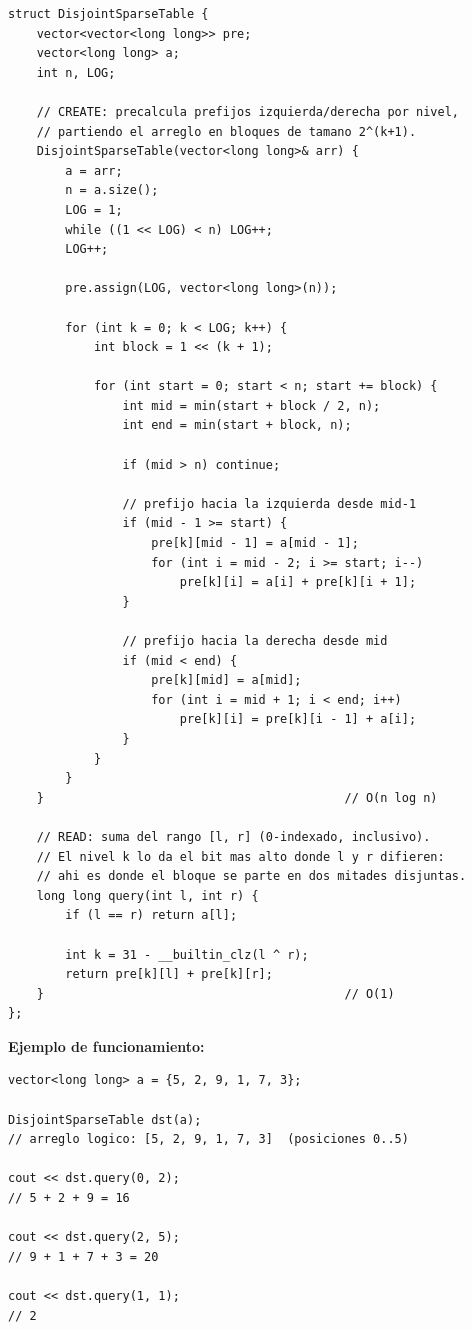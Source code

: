 \documentclass[10pt,a4paper,twocolumn]{article}
\begin{document}
\begin{lstlisting}[style=cpp]
struct DisjointSparseTable {
    vector<vector<long long>> pre;
    vector<long long> a;
    int n, LOG;

    // CREATE: precalcula prefijos izquierda/derecha por nivel,
    // partiendo el arreglo en bloques de tamano 2^(k+1).
    DisjointSparseTable(vector<long long>& arr) {
        a = arr;
        n = a.size();
        LOG = 1;
        while ((1 << LOG) < n) LOG++;
        LOG++;

        pre.assign(LOG, vector<long long>(n));

        for (int k = 0; k < LOG; k++) {
            int block = 1 << (k + 1);

            for (int start = 0; start < n; start += block) {
                int mid = min(start + block / 2, n);
                int end = min(start + block, n);

                if (mid > n) continue;

                // prefijo hacia la izquierda desde mid-1
                if (mid - 1 >= start) {
                    pre[k][mid - 1] = a[mid - 1];
                    for (int i = mid - 2; i >= start; i--)
                        pre[k][i] = a[i] + pre[k][i + 1];
                }

                // prefijo hacia la derecha desde mid
                if (mid < end) {
                    pre[k][mid] = a[mid];
                    for (int i = mid + 1; i < end; i++)
                        pre[k][i] = pre[k][i - 1] + a[i];
                }
            }
        }
    }                                          // O(n log n)

    // READ: suma del rango [l, r] (0-indexado, inclusivo).
    // El nivel k lo da el bit mas alto donde l y r difieren:
    // ahi es donde el bloque se parte en dos mitades disjuntas.
    long long query(int l, int r) {
        if (l == r) return a[l];

        int k = 31 - __builtin_clz(l ^ r);
        return pre[k][l] + pre[k][r];
    }                                          // O(1)
};
\end{lstlisting}

\textbf{Ejemplo de funcionamiento:}

\begin{lstlisting}[style=cpp]
vector<long long> a = {5, 2, 9, 1, 7, 3};

DisjointSparseTable dst(a);
// arreglo logico: [5, 2, 9, 1, 7, 3]  (posiciones 0..5)

cout << dst.query(0, 2);
// 5 + 2 + 9 = 16

cout << dst.query(2, 5);
// 9 + 1 + 7 + 3 = 20

cout << dst.query(1, 1);
// 2
\end{lstlisting}
\end{document}
